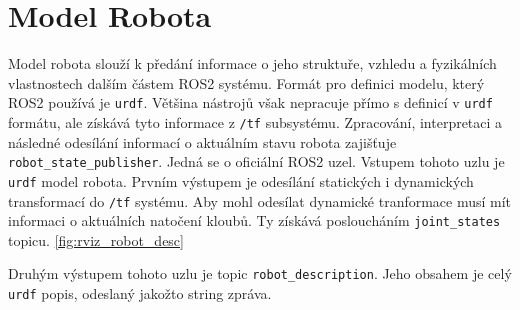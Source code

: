 \section{Model Robota} \label{implementation:model}
Model robota slouží k předání informace o jeho struktuře, vzhledu a fyzikálních vlastnostech dalším částem ROS2 systému. Formát pro definici modelu, který ROS2 používá je \verb|urdf|. Většina nástrojů však nepracuje přímo s definicí v \verb|urdf| formátu, ale získává tyto informace z \verb|/tf| subsystému. Zpracování, interpretaci a následné odesílání informací o aktuálním stavu robota zajišťuje \verb|robot_state_publisher|. Jedná se o oficiální ROS2 uzel. Vstupem tohoto uzlu je \verb|urdf| model robota. Prvním výstupem je odesílání statických i dynamických transformací do \verb|/tf| systému. Aby mohl odesílat dynamické tranformace musí mít informaci o aktuálních natočení kloubů. Ty získává posloucháním \verb|joint_states| topicu. \ref{fig:rviz_robot_desc}

Druhým výstupem tohoto uzlu je topic \verb|robot_description|. Jeho obsahem je celý \verb|urdf| popis, odeslaný jakožto string zpráva.

